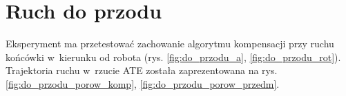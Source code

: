 
\section{Ruch do przodu}

Eksperyment ma przetestować zachowanie algorytmu kompensacji przy ruchu końcówki w~kierunku od robota (rys. \ref{fig:do_przodu_a}, \ref{fig:do_przodu_rot}). Trajektoria ruchu w~rzucie ATE została zaprezentowana na rys. \ref{fig:do_przodu_porow_komp}, \ref{fig:do_przodu_porow_przedm}.

